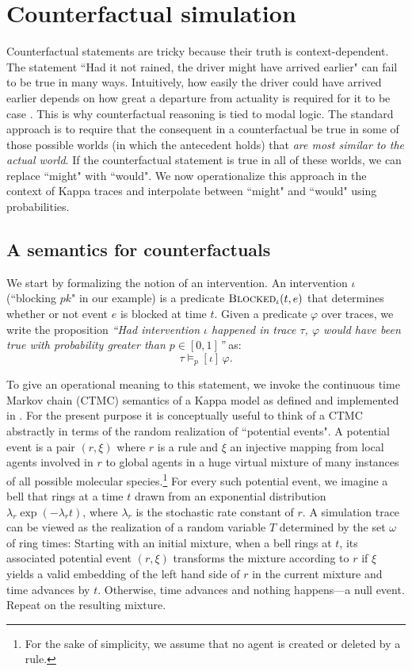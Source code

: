 \section{Counterfactual simulation}\label{sec:counterfactual}

Counterfactual statements are tricky because their truth is
context-dependent. The statement ``Had it not rained, the driver might
have arrived earlier" can fail to be true in many ways. Intuitively,
how easily the driver could have arrived earlier depends on how great
a departure from actuality is required for it to be case
\cite{Lewis1973}. This is why counterfactual reasoning is tied to
modal logic. The standard approach is to require that the consequent
in a counterfactual be true in some of those possible worlds (in which
the antecedent holds) that \textit{are most similar to the actual
  world}. If the counterfactual statement is true in all of these
worlds, we can replace ``might" with ``would".  We now operationalize
this approach in the context of Kappa traces and interpolate between
``might" and ``would" using probabilities.

\subsection{A semantics for counterfactuals}

We start by formalizing the notion of an intervention. An intervention
$\iota$ (``blocking $pk$" in our example) is a predicate
${\textsc{Blocked}}_{\iota}(t, e)$ that determines whether or not event $e$ is
blocked at time $t$. Given a predicate $\varphi$ over traces, we write
the proposition \textit{``Had intervention $\iota$ happened in trace
  $\tau$, $\varphi$ would have been true with probability greater than
  $p \in [0,1]$''} as:
\[ \tau \models_p [\iota] \, \varphi.
\]

To give an operational meaning to this statement, we invoke the
continuous time Markov chain (CTMC) semantics of a Kappa model as
defined and implemented in
\cite{DanosEtAl-APLAS07,BoutillierEK17}. For the present purpose it is
conceptually useful to think of a CTMC abstractly in terms of the
random realization of ``potential events". A potential event is a pair
$(r, \xi)$ where $r$ is a rule and $\xi$ an injective mapping from
local agents involved in $r$ to global agents in a huge virtual
mixture of many instances of all possible molecular
species.\footnote{For the sake of simplicity, we assume that no agent
  is created or deleted by a rule.} For every such potential event, we
imagine a bell that rings at a time $t$ drawn from an exponential
distribution $\lambda_r\exp(-\lambda_r t)$, where $\lambda_r$ is the
stochastic rate constant of $r$. A simulation trace can be viewed as
the realization of a random variable $T$ determined by the set
$\omega$ of ring times: Starting with an initial mixture, when a bell
rings at $t$, its associated potential event $(r, \xi)$ transforms the
mixture according to $r$ if $\xi$ yields a valid embedding of the left
hand side of $r$ in the current mixture and time advances by
$t$. Otherwise, time advances and nothing happens---a null
event. Repeat on the resulting mixture.

